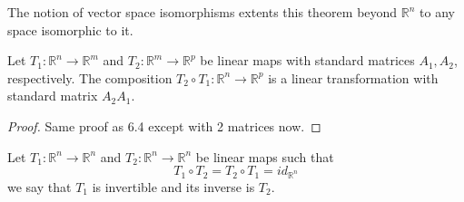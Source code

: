 The notion of vector space isomorphisms extents this theorem beyond \(\mathbb{R}^n\) to any space isomorphic to it.
\begin{theorem}
    Let \(T_1:\mathbb{R} ^n\to \mathbb{R} ^m\) and \(T_2:\mathbb{R} ^m\to \mathbb{R} ^p\) be linear maps with standard matrices \(A_1,A_2\), respectively. The composition \(T_2 \circ T_1:\mathbb{R} ^n\to \mathbb{R} ^p\) is a linear transformation with standard matrix \(A_2 A_1\).
\end{theorem}
\begin{proof}
    Same proof as 6.4 except with 2 matrices now.
\end{proof}
\begin{definition}
    Let \(T_1:\mathbb{R} ^n\to \mathbb{R} ^n\) and \(T_2:\mathbb{R} ^n\to \mathbb{R} ^n\) be linear maps such that
    \[
        T_1 \circ T_2 = T_2 \circ T_1 = id_{\mathbb{R}^n}
    \]
    we say that \(T_1\) is invertible and its inverse is \(T_2\).
\end{definition}